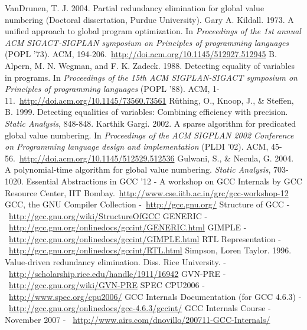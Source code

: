 \cleardoublepage
{}
{}
\begin{thebibliography}{99}

VanDrunen, T. J. 2004. Partial redundancy elimination for global value numbering (Doctoral dissertation, Purdue University).
Gary A. Kildall. 1973. A unified approach to global program optimization. In \emph{Proceedings of the 1st annual ACM SIGACT-SIGPLAN symposium on Principles of programming languages} (POPL '73). ACM, 194-206.\ \url{http://doi.acm.org/10.1145/512927.512945}
B. Alpern, M. N. Wegman, and F. K. Zadeck. 1988. Detecting equality of variables in programs. In \emph{Proceedings of the 15th ACM SIGPLAN-SIGACT symposium on Principles of programming languages} (POPL '88). ACM, 1-11.\ \url{http://doi.acm.org/10.1145/73560.73561}
R\"uthing, O., Knoop, J., \& Steffen, B. 1999. Detecting equalities of variables: Combining efficiency with precision. \emph{Static Analysis}, 848-848.
Karthik Gargi. 2002. A sparse algorithm for predicated global value numbering. In \emph{Proceedings of the ACM SIGPLAN 2002 Conference on Programming language design and implementation} (PLDI '02). ACM, 45-56.\ \url{http://doi.acm.org/10.1145/512529.512536}
Gulwani, S., \& Necula, G. 2004. A polynomial-time algorithm for global value numbering. \emph{Static Analysis}, 703-1020.
Essential Abstractions in GCC '12 - A workshop on GCC Internals by GCC Resource Center, IIT Bombay.\ \url{http://www.cse.iitb.ac.in/grc/gcc-workshop-12}
GCC, the GNU Compiler Collection -\ \url{http://gcc.gnu.org/}
Structure of GCC -\ \url{http://gcc.gnu.org/wiki/StructureOfGCC}
GENERIC -\ \url{http://gcc.gnu.org/onlinedocs/gccint/GENERIC.html}
GIMPLE -\ \url{http://gcc.gnu.org/onlinedocs/gccint/GIMPLE.html}
RTL Representation -\ \url{http://gcc.gnu.org/onlinedocs/gccint/RTL.html}
Simpson, Loren Taylor. 1996. Value-driven redundancy elimination. Diss. Rice University. -\ \url{http://scholarship.rice.edu/handle/1911/16942}
GVN-PRE - \ \url{http://gcc.gnu.org/wiki/GVN-PRE}
SPEC CPU2006 - \ \url{http://www.spec.org/cpu2006/}
GCC Internals Documentation (for GCC 4.6.3) - \ \url{http://gcc.gnu.org/onlinedocs/gcc-4.6.3/gccint/}
GCC Internals Course - November 2007 - \ \url{http://www.airs.com/dnovillo/200711-GCC-Internals/}

\end{thebibliography}
